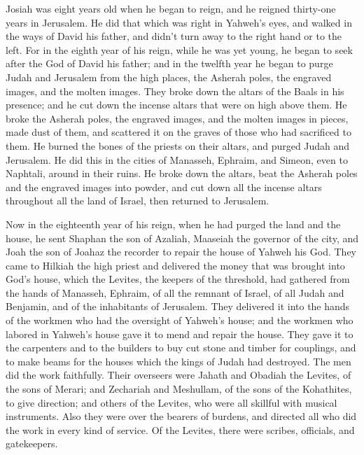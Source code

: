  Josiah was eight years old when he began to reign, and he
reigned thirty-one years in Jerusalem.  He did that which
was right in Yahweh's eyes, and walked in the ways of David his father,
and didn't turn away to the right hand or to the left. 
For in the eighth year of his reign, while he was yet young, he began to
seek after the God of David his father; and in the twelfth year he began
to purge Judah and Jerusalem from the high places, the Asherah poles,
the engraved images, and the molten images.  They broke
down the altars of the Baals in his presence; and he cut down the
incense altars that were on high above them. He broke the Asherah poles,
the engraved images, and the molten images in pieces, made dust of them,
and scattered it on the graves of those who had sacrificed to them.
 He burned the bones of the priests on their altars, and
purged Judah and Jerusalem.  He did this in the cities of
Manasseh, Ephraim, and Simeon, even to Naphtali, around in their ruins.
 He broke down the altars, beat the Asherah poles and the
engraved images into powder, and cut down all the incense altars
throughout all the land of Israel, then returned to Jerusalem.

 Now in the eighteenth year of his reign, when he had
purged the land and the house, he sent Shaphan the son of Azaliah,
Maaseiah the governor of the city, and Joah the son of Joahaz the
recorder to repair the house of Yahweh his God.  They came
to Hilkiah the high priest and delivered the money that was brought into
God's house, which the Levites, the keepers of the threshold, had
gathered from the hands of Manasseh, Ephraim, of all the remnant of
Israel, of all Judah and Benjamin, and of the inhabitants of Jerusalem.
 They delivered it into the hands of the workmen who had
the oversight of Yahweh's house; and the workmen who labored in Yahweh's
house gave it to mend and repair the house.  They gave it
to the carpenters and to the builders to buy cut stone and timber for
couplings, and to make beams for the houses which the kings of Judah had
destroyed.  The men did the work faithfully. Their
overseers were Jahath and Obadiah the Levites, of the sons of Merari;
and Zechariah and Meshullam, of the sons of the Kohathites, to give
direction; and others of the Levites, who were all skillful with musical
instruments.  Also they were over the bearers of burdens,
and directed all who did the work in every kind of service. Of the
Levites, there were scribes, officials, and gatekeepers.

